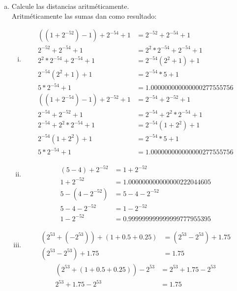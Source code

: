\documentclass[10pt]{article}
\begin{document}
\begin{enumerate}[a)]
\item Calcule las distancias aritméticamente.\\
Aritméticamente las sumas dan como resultado:
\begin{enumerate}[(i)]
\item 
\begin{equation}
\begin{aligned}
((1 + 2^{-52}) - 1) + 2^{-54} + 1 &= 2^{-52} + 2^{-54} + 1 \\
2^{-52} + 2^{-54} + 1 &= 2^{2} * 2^{-54} + 2^{-54} + 1 \\
2^{2} * 2^{-54} + 2^{-54} + 1 &= 2^{-54}( 2^{2} + 1) + 1 \\
2^{-54}( 2^{2} + 1) + 1 &= 2^{-54} * 5 + 1 \\
5 * 2^{-54} + 1 &= 1.000000000000000277555756
\end{aligned}
\end{equation}
\begin{equation}
\begin{aligned}
((1 + 2^{-54}) - 1) + 2^{-52} + 1 &= 2^{-54} + 2^{-52} + 1\\
2^{-54} + 2^{-52} + 1 &= 2^{-54} + 2^{2} * 2^{-54} + 1 \\
2^{-54} + 2^{2} * 2^{-54} + 1 &= 2^{-54}( 1 + 2^{2}) + 1\\
2^{-54}( 1 + 2^{2}) + 1 &= 2^{-54} * 5 + 1 \\
5 * 2^{-54} + 1 &= 1.000000000000000277555756
\end{aligned}
\end{equation}

\item 
\begin{equation}
\begin{aligned}
(5 - 4) + 2^{-52} &= 1 + 2^{-52} \\
1 + 2^{-52} &= 1.000000000000000222044605
\end{aligned}
\end{equation}
\begin{equation}
\begin{aligned}
5 - (4 - 2^{-52}) &= 5 - 4 - 2^{-52}\\
5 - 4 - 2^{-52} &= 1 - 2^{-52} \\
1 - 2^{-52} &= 0.999999999999999777955395
\end{aligned}
\end{equation}

\item 
\begin{equation}
\begin{aligned}
(2^{53} + (-2^{53})) + (1 + 0.5 + 0.25) &= (2^{53} - 2^{53}) + 1.75 \\
(2^{53} - 2^{53}) + 1.75 &= 1.75
\end{aligned}
\end{equation}
\begin{equation}
\begin{aligned}
(2^{53} + (1 + 0.5 + 0.25)) - 2^{53} &= 2^{53} + 1.75 -  2^{53} \\
2^{53} + 1.75 -  2^{53} &= 1.75
\end{aligned}
\end{equation}


\end{enumerate}
\end{enumerate}
\end{document}
